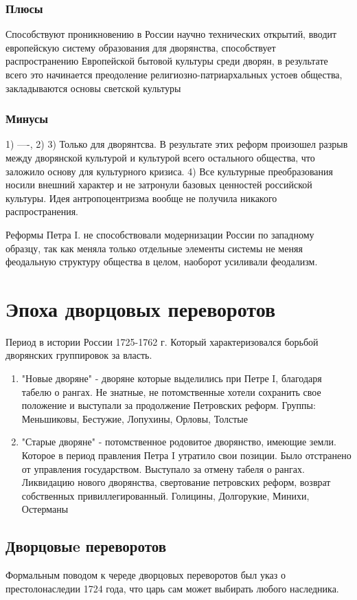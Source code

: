 \documentclass[a4paper]{article}
\begin{document}
\subsubsection{Плюсы}
Способствуют проникновению в России научно технических открытий, вводит европейскую систему образования для дворянства, способствует распространению Европейской бытовой культуры среди дворян, в результате всего это начинается преодоление религиозно-патриархальных устоев общества, закладываются основы светской культуры
\subsubsection{Минусы}
1) ----, 2) 3) Только для дворянтсва. В результате этих реформ произошел разрыв между дворянской культурой и культурой всего остального общества, что заложило основу для культурного кризиса. 4) Все культурные преобразования носили внешний характер и не затронули базовых ценностей российской культуры. Идея антропоцентризма вообще не получила никакого распространения.

Реформы Петра I. не способствовали модернизации России по западному образцу, так как меняла только отдельные элементы системы не меняя феодальную структуру общества в целом, наоборот усиливали феодализм.

\section{Эпоха дворцовых переворотов}
Период в истории России 1725-1762 г. Который характеризовался борьбой дворянских группировок за власть.

\begin{enumerate}
    \item "Новые дворяне" - дворяне которые выделились при Петре I, благодаря табелю о рангах. Не знатные, не потомственные хотели сохранить свое положение и выступали за продолжение Петровских реформ.
    Группы: Меньшиковы, Бестужие, Лопухины, Орловы, Толстые
    \item "Старые дворяне" - потомственное родовитое дворянство, имеющие земли. Которое в период правления Петра I утратило свои позиции. Было отстранено от управления государством. Выступало за отмену табеля о рангах. Ликвидацию нового дворянства, свертование петровских реформ, возврат собственных привиллегированный. Голицины, Долгорукие, Минихи, Остерманы
\end{enumerate}

\subsection{Дворцовыe переворотов}
Формальным поводом к череде дворцовых переворотов был указ о престолонаследии 1724 года, что царь сам может выбирать любого наследника.
\end{document}
